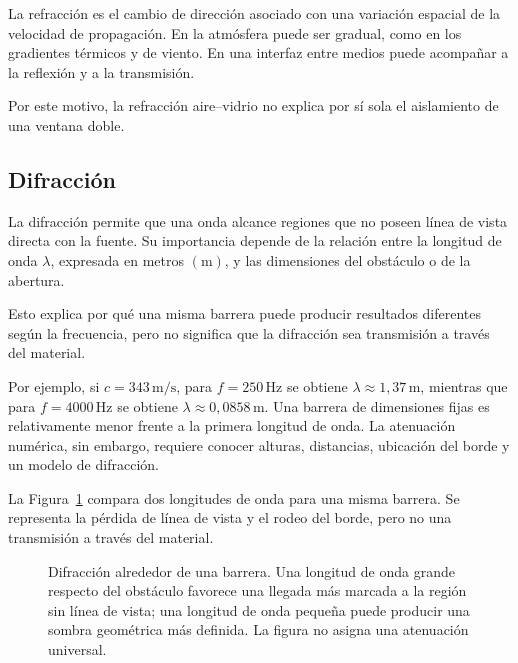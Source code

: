 La refracción es el cambio de dirección asociado con una variación espacial de
la velocidad de propagación. En la atmósfera puede ser gradual, como en los
gradientes térmicos y de viento. En una interfaz entre medios puede acompañar
a la reflexión y a la transmisión.

 Por este motivo, la
refracción aire--vidrio no explica por sí sola el aislamiento de una ventana
doble.

\subsection{Difracción}
\label{sec:u9-difraccion}

La difracción permite que una onda alcance regiones que no poseen línea de
vista directa con la fuente. Su importancia depende de la relación entre la
longitud de onda \(\lambda\), expresada en metros \((\text{m})\), y las
dimensiones del obstáculo o de la abertura.

 Esto explica
por qué una misma barrera puede producir resultados diferentes según la
frecuencia, pero no significa que la difracción sea transmisión a través del
material.

Por ejemplo, si \(c=343\,\text{m}/\text{s}\), para \(f=250\,\text{Hz}\) se
obtiene \(\lambda\approx1{,}37\,\text{m}\), mientras que para
\(f=4000\,\text{Hz}\) se obtiene \(\lambda\approx0{,}0858\,\text{m}\). Una
barrera de dimensiones fijas es relativamente menor frente a la primera
longitud de onda. La atenuación numérica, sin embargo, requiere conocer
alturas, distancias, ubicación del borde y un modelo de difracción.

La Figura~\ref{fig:u9-difraccion-barrera} compara dos longitudes de onda para
una misma barrera. Se representa la pérdida de línea de vista y el rodeo del
borde, pero no una transmisión a través del material.

\begin{figure}[htbp]
    \centering
    
    \caption{Difracción alrededor de una barrera. Una longitud de onda grande
    respecto del obstáculo favorece una llegada más marcada a la región sin
    línea de vista; una longitud de onda pequeña puede producir una sombra
    geométrica más definida. La figura no asigna una atenuación universal.}
    \label{fig:u9-difraccion-barrera}
\end{figure}

